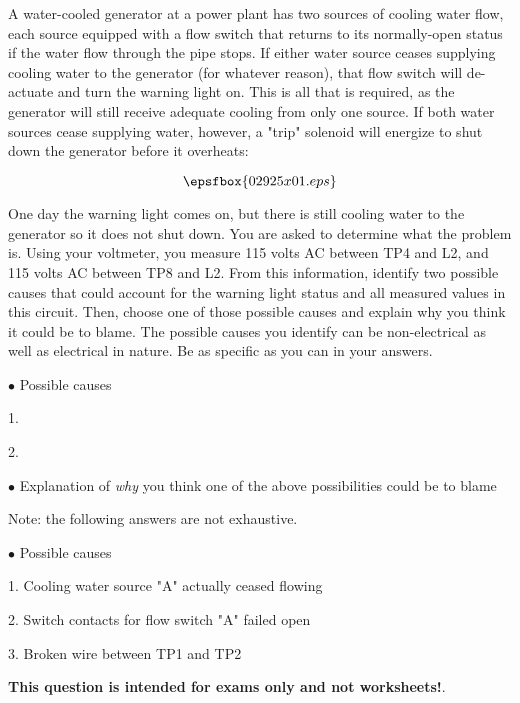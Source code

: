 

A water-cooled generator at a power plant has two sources of cooling water flow, each source equipped with a flow switch that returns to its normally-open status if the water flow through the pipe stops.  If either water source ceases supplying cooling water to the generator (for whatever reason), that flow switch will de-actuate and turn the warning light on.  This is all that is required, as the generator will still receive adequate cooling from only one source.  If both water sources cease supplying water, however, a "trip" solenoid will energize to shut down the generator before it overheats:

$$\epsfbox{02925x01.eps}$$

One day the warning light comes on, but there is still cooling water to the generator so it does not shut down.  You are asked to determine what the problem is.  Using your voltmeter, you measure 115 volts AC between TP4 and L2, and 115 volts AC between TP8 and L2.  From this information, identify two possible causes that could account for the warning light status and all measured values in this circuit.  Then, choose one of those possible causes and explain why you think it could be to blame.  The possible causes you identify can be non-electrical as well as electrical in nature.  Be as specific as you can in your answers.

\medskip
\goodbreak
\item{$\bullet$} Possible causes
\item{1.}
\item{2.} 
\medskip

\medskip
\goodbreak
\item{$\bullet$} Explanation of {\it why} you think one of the above possibilities could be to blame

\vskip 30pt







Note: the following answers are not exhaustive.

\medskip
\goodbreak
\item{$\bullet$} Possible causes
\item{1.} Cooling water source "A" actually ceased flowing
\item{2.} Switch contacts for flow switch "A" failed open
\item{3.} Broken wire between TP1 and TP2
\medskip







{\bf This question is intended for exams only and not worksheets!}.




